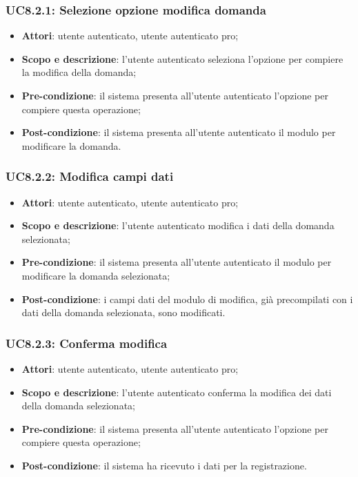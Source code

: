 	\subsubsection{UC8.2.1: Selezione opzione modifica domanda}
	\begin{itemize}
		\item
			\textbf{Attori}: utente autenticato, utente autenticato pro;
		\item
			\textbf{Scopo e descrizione}: l'utente autenticato seleziona l'opzione per compiere la modifica della domanda;
		\item		
			\textbf{Pre-condizione}: il sistema presenta all'utente autenticato l'opzione per compiere questa operazione;
		\item
			\textbf{Post-condizione}: il sistema presenta all'utente autenticato il modulo per modificare la domanda.
	\end{itemize}
	\subsubsection{UC8.2.2: Modifica campi dati}
	\begin{itemize}
		\item
			\textbf{Attori}: utente autenticato, utente autenticato pro;
		\item
			\textbf{Scopo e descrizione}: l'utente autenticato modifica i dati della domanda selezionata;
		\item		
			\textbf{Pre-condizione}: il sistema presenta all'utente autenticato il modulo per modificare la domanda selezionata;
		\item
			\textbf{Post-condizione}: i campi dati del modulo di modifica, già precompilati con i dati della domanda selezionata, sono modificati.
	\end{itemize}		
	\subsubsection{UC8.2.3: Conferma modifica}
	\begin{itemize}
		\item
			\textbf{Attori}: utente autenticato, utente autenticato pro;
		\item
			\textbf{Scopo e descrizione}: l'utente autenticato conferma la modifica dei dati della domanda selezionata;
		\item		
			\textbf{Pre-condizione}: il sistema presenta all'utente autenticato l'opzione per compiere questa operazione;
		\item
			\textbf{Post-condizione}: il sistema ha ricevuto i dati per la registrazione.
	\end{itemize}		
